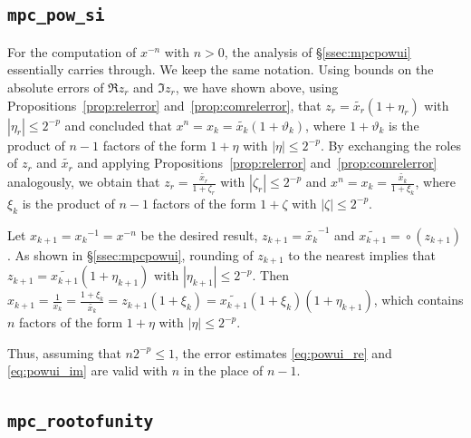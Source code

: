\documentclass [11pt]{article}
\newcommand {\corr}[1]{{#1}}
\newcommand {\appro}[1]{\widetilde {#1}}
\newcommand {\round}{\operatorname {\circ}}
\renewcommand {\theta}{\vartheta}
\renewcommand {\leq}{\leqslant}
\begin{document}
\subsection {\texttt {mpc\_pow\_si}}

For the computation of $x^{-n}$ with $n > 0$, the analysis of
\S\ref {ssec:mpcpowui} essentially carries through. We keep the same
notation. Using bounds on the absolute errors of $\Re z_r$ and $\Im z_r$,
we have shown above, using Propositions~\ref {prop:relerror}
and~\ref {prop:comrelerror}, that $z_r = \appro {x_r} (1 + \eta_r)$ with
$|\eta_r| \leq 2^{-p}$ and concluded that
$x^n = \corr {x_k} = \appro {x_k} (1 + \theta_k)$, where
$1 + \theta_k$ is the product of $n-1$ factors of the form
$1 + \eta$  with $|\eta| \leq 2^{-p}$.
By exchanging the roles of $z_r$ and $\appro {x_r}$ and applying
Propositions~\ref {prop:relerror} and~\ref {prop:comrelerror}
analogously, we obtain that $z_r = \frac {\appro {x_r}}{1 + \zeta_r}$ with
$|\zeta_r| \leq 2^{-p}$ and
$x^n = \corr {x_k} = \frac {\appro {x_k}}{1 + \xi_k}$, where
$\xi_k$ is the product of $n-1$ factors of the form
$1 + \zeta$  with $|\zeta| \leq 2^{-p}$.

Let $\corr {x_{k+1}} = \corr {x_k}^{-1} = x^{-n}$ be the desired
result, $z_{k+1} = \appro {x_k}^{-1}$
and $\appro {x_{k+1}} = \round (z_{k+1})$. As shown in \S\ref {ssec:mpcpowui},
rounding of $z_{k+1}$ to the nearest implies that
$z_{k+1} = \appro {x_{k+1}} (1 + \eta_{k+1})$ with
$|\eta_{k+1}| \leq 2^{-p}$.
Then $\corr {x_{k+1}} = \frac {1}{x_k}
= \frac {1 + \xi_k}{\appro {x_k}}
= z_{k+1} (1 + \xi_k)
= \appro {x_{k+1}} (1 + \xi_k)(1 + \eta_{k+1})$,
which contains $n$ factors of the form $1 + \eta$ with
$|\eta| \leq 2^{-p}$.

Thus, assuming that $n 2^{-p} \leq 1$, the error estimates
\eqref {eq:powui_re} and \eqref {eq:powui_im} are valid with $n$
in the place of $n - 1$.


\subsection {\texttt {mpc\_rootofunity}}
\end{document}
